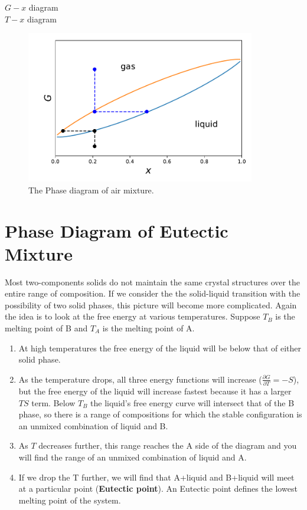 $G-x$ diagram\\
$T-x$ diagram\\
\begin{figure}[ht]
\centering
\includegraphics[width=10cm]{imgs/air.pdf}
\caption{The Phase diagram of air mixture.}
\end{figure}


\section{Phase Diagram of Eutectic Mixture}
Most two-components solids do not maintain the same crystal structures over the entire range of composition. If we consider the the solid-liquid transition with the possibility of two solid phases, this picture will become more complicated. Again the idea is to look at the free energy at various temperatures. Suppose $T_B$ is the melting point of B and $T_A$ is the melting point of A. 

\begin{enumerate}
    \item At high temperatures the free energy of the liquid will be below that of either solid phase. 
    \item As the temperature drops, all three energy functions will increase ($\frac{\partial G}{\partial T}=-S$), but the free energy of the liquid will increase fastest because it has a larger $TS$ term. Below $T_B$ the liquid's free energy curve will intersect that of the B phase, so there is a range of compositions for which the stable configuration is an unmixed combination of liquid and B. 
    \item As $T$ decreases further, this range reaches the A side of the diagram and you will find the range of an unmixed combination of liquid and A.
    \item If we drop the T further, we will find that A+liquid and B+liquid will meet at a particular point (\textbf{Eutectic point}). An Eutectic point defines the lowest melting point of the system. 
\end{enumerate}

